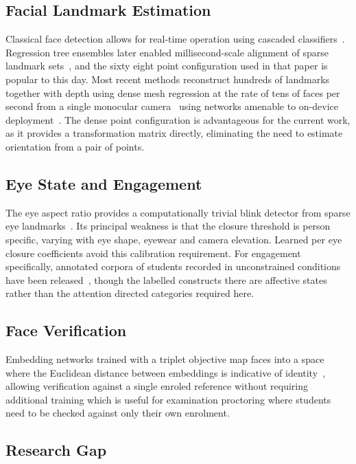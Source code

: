 \documentclass[conference]{IEEEtran}
\begin{document}
\subsection{Facial Landmark Estimation}

Classical face detection allows for real-time operation using cascaded
classifiers~\cite{viola2001}. Regression tree ensembles later enabled millisecond-scale alignment of sparse landmark
sets~\cite{kazemi2014}, and the sixty eight point configuration used in that paper is popular to this day. Most recent methods reconstruct hundreds of landmarks together with depth using dense mesh regression at the rate of tens of faces per second from a single monocular camera~\cite{kartynnik2019} using networks amenable to on-device
deployment~\cite{lugaresi2019}. The dense point configuration is advantageous for the current work, as it provides a transformation matrix directly, eliminating the need to estimate orientation from a pair of points.

\subsection{Eye State and Engagement}

The eye aspect ratio provides a computationally trivial blink
detector from sparse eye landmarks~\cite{soukupova2016}. Its principal
weakness is that the closure threshold is person specific, varying with
eye shape, eyewear and camera elevation. Learned per eye closure
coefficients avoid this calibration requirement. For engagement
specifically, annotated corpora of students recorded in unconstrained
conditions have been released~\cite{gupta2016}, though the labelled
constructs there are affective states rather than the attention directed
categories required here.

\subsection{Face Verification}

Embedding networks trained with a triplet objective map faces into a space
where the Euclidean distance between embeddings is indicative of identity~\cite{schroff2015},
allowing verification against a single enroled reference without requiring additional training
which is useful for examination proctoring where students need to be checked against only their own enrolment.

\subsection{Research Gap}
\end{document}
